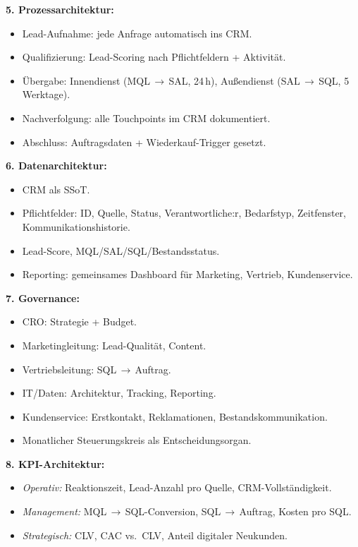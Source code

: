\documentclass[11pt,a4paper,oneside]{article}
\begin{document}
\begin{loesungbox}
\textbf{5. Prozessarchitektur:}
\begin{itemize}
  \item Lead-Aufnahme: jede Anfrage automatisch ins CRM.
  \item Qualifizierung: Lead-Scoring nach Pflichtfeldern + Aktivität.
  \item Übergabe: Innendienst (MQL\,$\rightarrow$\,SAL, 24\,h), Außendienst (SAL\,$\rightarrow$\,SQL, 5\,Werktage).
  \item Nachverfolgung: alle Touchpoints im CRM dokumentiert.
  \item Abschluss: Auftragsdaten + Wiederkauf-Trigger gesetzt.
\end{itemize}

\textbf{6. Datenarchitektur:}
\begin{itemize}
  \item CRM als SSoT.
  \item Pflichtfelder: ID, Quelle, Status, Verantwortliche:r, Bedarfstyp, Zeitfenster, Kommunikationshistorie.
  \item Lead-Score, MQL/SAL/SQL/Bestandsstatus.
  \item Reporting: gemeinsames Dashboard für Marketing, Vertrieb, Kundenservice.
\end{itemize}

\textbf{7. Governance:}
\begin{itemize}
  \item CRO: Strategie + Budget.
  \item Marketingleitung: Lead-Qualität, Content.
  \item Vertriebsleitung: SQL\,$\rightarrow$\,Auftrag.
  \item IT/Daten: Architektur, Tracking, Reporting.
  \item Kundenservice: Erstkontakt, Reklamationen, Bestandskommunikation.
  \item Monatlicher Steuerungskreis als Entscheidungsorgan.
\end{itemize}

\textbf{8. KPI-Architektur:}
\begin{itemize}
  \item \emph{Operativ:} Reaktionszeit, Lead-Anzahl pro Quelle, CRM-Vollständigkeit.
  \item \emph{Management:} MQL\,$\rightarrow$\,SQL-Conversion, SQL\,$\rightarrow$\,Auftrag, Kosten pro SQL.
  \item \emph{Strategisch:} CLV, CAC vs.\ CLV, Anteil digitaler Neukunden.
\end{itemize}


\end{loesungbox}
\end{document}
